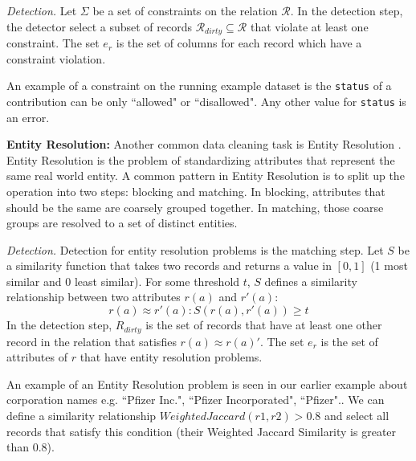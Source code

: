 \emph{Detection. } Let $\Sigma$ be a set of constraints on the relation $\mathcal{R}$. 
In the detection step, the detector select a subset of records $\mathcal{R}_{dirty} \subseteq \mathcal{R}$ that violate at least one constraint.
The set $e_r$ is the set of columns for each record which have a constraint violation. 

\begin{example}
An example of a constraint on the running example dataset is the \texttt{status} of
a contribution can be only ``allowed" or ``disallowed".
Any other value for \texttt{status} is an error.
\end{example}

\vspace{0.5em}

\noindent\textbf{Entity Resolution: }
Another common data cleaning task is Entity Resolution \cite{gokhale2014corleone, DBLP:journals/pvldb/KopckeTR10, wang2012crowder}.
Entity Resolution is the problem of standardizing attributes that represent the same real world entity.
A common pattern in Entity Resolution is to split up the operation into two steps: blocking and matching.
In blocking, attributes that should be the same are coarsely grouped together.
In matching, those coarse groups are resolved to a set of distinct entities.

\vspace{0.5em}

\emph{Detection. } Detection for entity resolution problems is the matching step. Let $S$ be a similarity function that takes two records and returns a value in $[0,1]$ (1 most similar and 0 least similar). For some threshold $t$, $S$ defines a similarity relationship between two attributes $r(a)$ and $r'(a)$:
\[
r(a) \approx r'(a) : S(r(a),r'(a)) \ge t
\] 
In the detection step, $R_{dirty}$ is the set of records that have at least one other record in the relation that satisfies $r(a) \approx r(a)'$.
The set $e_r$ is the set of attributes of $r$ that have entity resolution problems.

\begin{example}
An example of an Entity Resolution problem is seen in our earlier example about corporation names e.g. ``Pfizer Inc.", ``Pfizer Incorporated", ``Pfizer".. 
We can define a similarity relationship $WeightedJaccard(r1,r2)>0.8$ and select all records that satisfy this condition (their Weighted Jaccard Similarity is greater than 0.8).
\end{example}

